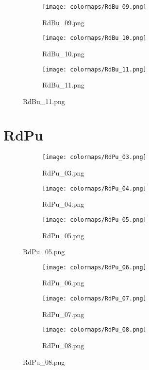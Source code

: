 \documentclass{article}%
\begin{document}
%
\hspace{1cm}\hfill%
\hspace{1cm}\hfill%
\hspace{1cm}\hfill%


\begin{figure}[h!]%
\begin{subfigure}[b]{0.3\linewidth}%
\texttt{[image: colormaps/RdBu\_09.png]}%
\caption{RdBu\_09.png}%
\end{subfigure}%
\begin{subfigure}[b]{0.3\linewidth}%
\texttt{[image: colormaps/RdBu\_10.png]}%
\caption{RdBu\_10.png}%
\end{subfigure}%
\begin{subfigure}[b]{0.3\linewidth}%
\texttt{[image: colormaps/RdBu\_11.png]}%
\caption{RdBu\_11.png}%
\end{subfigure}%
\end{figure}

%
\newpage%
\section{RdPu}%
\label{sec:RdPu}%
\hspace{1cm}\hfill%
\hspace{1cm}\hfill%
\hspace{1cm}\hfill%


\begin{figure}[h!]%
\begin{subfigure}[b]{0.3\linewidth}%
\texttt{[image: colormaps/RdPu\_03.png]}%
\caption{RdPu\_03.png}%
\end{subfigure}%
\begin{subfigure}[b]{0.3\linewidth}%
\texttt{[image: colormaps/RdPu\_04.png]}%
\caption{RdPu\_04.png}%
\end{subfigure}%
\begin{subfigure}[b]{0.3\linewidth}%
\texttt{[image: colormaps/RdPu\_05.png]}%
\caption{RdPu\_05.png}%
\end{subfigure}%
\end{figure}

%
\hspace{1cm}\hfill%
\hspace{1cm}\hfill%
\hspace{1cm}\hfill%


\begin{figure}[h!]%
\begin{subfigure}[b]{0.3\linewidth}%
\texttt{[image: colormaps/RdPu\_06.png]}%
\caption{RdPu\_06.png}%
\end{subfigure}%
\begin{subfigure}[b]{0.3\linewidth}%
\texttt{[image: colormaps/RdPu\_07.png]}%
\caption{RdPu\_07.png}%
\end{subfigure}%
\begin{subfigure}[b]{0.3\linewidth}%
\texttt{[image: colormaps/RdPu\_08.png]}%
\caption{RdPu\_08.png}%
\end{subfigure}%
\end{figure}
\end{document}
